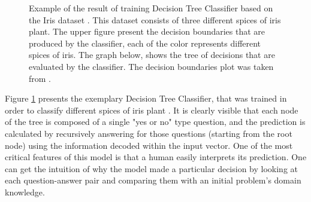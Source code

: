 \begin{figure}%
    \centering
    \qquad
    \caption{Example of the result of training Decision Tree Classifier based on the Iris dataset \cite{fisher} \cite{anderson}. This dataset consists of three different spices of iris plant. The upper figure present the decision boundaries that are produced by the classifier, each of the color represents different spices of iris. The graph below, shows the tree of decisions that are evaluated by the classifier. The decision boundaries plot was taken from \cite{DecisionTrees}. }%
    \label{fig:Decision Tree}%
\end{figure}

Figure \ref{fig:Decision Tree} presents the exemplary Decision Tree Classifier, that was trained in order to classify different spices of iris plant \cite{fisher} \cite{anderson}. It is clearly visible that each node of the tree is composed of a single "yes or no" type question, and the prediction is calculated by recursively answering for those questions (starting from the root node) using the information decoded within the input vector. One of the most critical features of this model is that a human easily interprets its prediction. One can get the intuition of why the model made a particular decision by looking at each question-answer pair and comparing them with an initial problem's domain knowledge.

